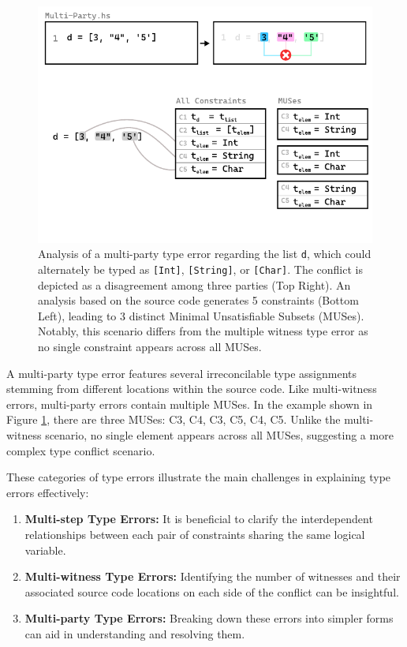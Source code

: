 \begin{figure}[hbt]
  \centering
  \includegraphics[width=\linewidth]{Multi-Party-MUS}
  \caption[Illustration of a multi-party type error in the context of MUSes]{\label{fig:multi-party-2} Analysis of a multi-party type error regarding the list \texttt{d}, which could alternately be typed as \texttt{[Int]}, \texttt{[String]}, or \texttt{[Char]}. The conflict is depicted as a disagreement among three parties (Top Right). An analysis based on the source code generates 5 constraints (Bottom Left), leading to 3 distinct Minimal Unsatisfiable Subsets (MUSes). Notably, this scenario differs from the multiple witness type error as no single constraint appears across all MUSes.}
  \end{figure}

A multi-party type error features several irreconcilable type assignments stemming from different locations within the source code. Like multi-witness errors, multi-party errors contain multiple MUSes. In the example shown in Figure \ref{fig:multi-party-2}, there are three MUSes: {C3, C4}, {C3, C5}, {C4, C5}. Unlike the multi-witness scenario, no single element appears across all MUSes, suggesting a more complex type conflict scenario.

These categories of type errors illustrate the main challenges in explaining type errors effectively:
\begin{enumerate}
  \item {
    \textbf{Multi-step Type Errors:} It is beneficial to clarify the interdependent relationships between each pair of constraints sharing the same logical variable.
  }
  \item {
    \textbf{Multi-witness Type Errors:} Identifying the number of witnesses and their associated source code locations on each side of the conflict can be insightful.
  }
  \item {
    \textbf{Multi-party Type Errors:} Breaking down these errors into simpler forms can aid in understanding and resolving them.
  }
\end{enumerate}

